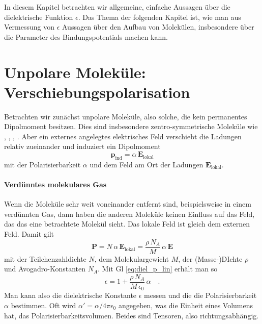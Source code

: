 In diesem Kapitel betrachten wir allgemeine, einfache Aussagen über die dielektrische Funktion $\epsilon$.
Das Thema der folgenden Kapitel ist, wie man aus Vermessung von $\epsilon$ Aussagen über den Aufbau  von Molekülen, insbesondere über die Parameter des Bindungspotentials machen kann.





\section{Unpolare Moleküle: Verschiebungspolarisation}

Betrachten wir zunächst unpolare Moleküle, also solche, die kein permanentes Dipolmoment  besitzen. Dies sind insbesondere zentro-symmetrische Moleküle wie , , , . Aber ein externes angelegtes elektrisches Feld verschiebt die Ladungen relativ zueinander und induziert ein Dipolmoment
\begin{equation}
 \mathbf{p}_\text{ind} = \alpha \, \mathbf{E}_\text{lokal}
\end{equation}
mit der Polarisierbarkeit $\alpha$ und dem Feld am Ort der Ladungen $\mathbf{E}_\text{lokal}$.

\paragraph{Verdünntes molekulares Gas} Wenn die Moleküle sehr weit voneinander entfernt sind, beispielsweise in einem verdünnten Gas, dann haben die anderen Moleküle keinen Einfluss auf das Feld, das das eine betrachtete Molekül sieht. Das lokale Feld ist gleich dem externen Feld.
 Damit gilt
\begin{equation}
 \mathbf{P} = N \, \alpha \, \mathbf{E}_\text{lokal} =  \frac{\rho \, N_A } {M} \, \alpha \, \mathbf{E} \label{eq:diel_pind}
\end{equation}
mit der Teilchenzahldichte $N$, dem Molekulargewicht $M$, der (Masse-)DIchte $\rho$ und Avogadro-Konstanten $N_A$. Mit Gl \ref{eq:diel_p_lin} erhält man so
\begin{equation}
 \epsilon = 1 +  \frac{\rho \, N_A } {M \, \epsilon_0} \, \alpha   \quad .
\end{equation}
Man kann also die dielektrische Konstante $\epsilon$ messen und die die Polarisierbarkeit $\alpha$ bestimmen. Oft wird $\alpha' = \alpha / 4 \pi \epsilon_0$ angegeben, was die Einheit eines Volumens hat, das Polarisierbarkeitsvolumen. Beides sind Tensoren, also richtungsabhängig.

